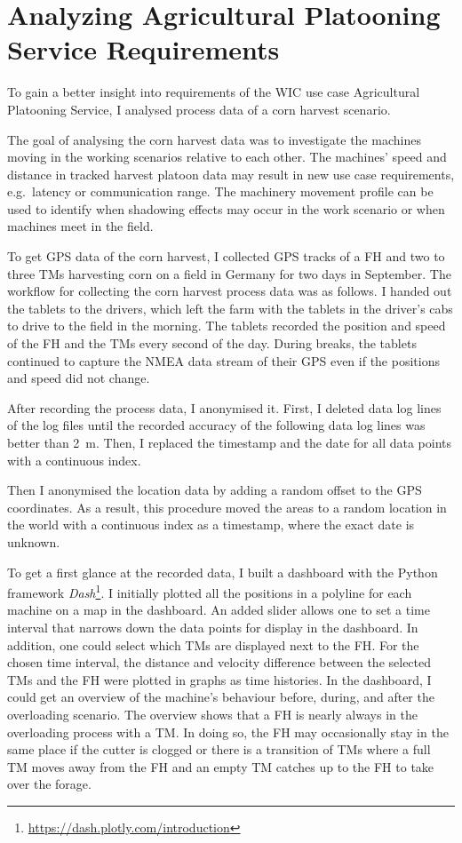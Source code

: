 \chapter{Analyzing Agricultural Platooning Service Requirements}
\label{chap:cornHarvestData}
To gain a better insight into requirements of the \ac{WIC} use case Agricultural Platooning Service,
I analysed process data of a corn harvest scenario.

The goal of analysing the corn harvest data was to investigate the machines moving in the working scenarios relative to each other.
The machines' speed and distance in tracked harvest platoon data may result in new use case requirements,
e.g.\ latency or communication range.
The machinery movement profile can be used to identify when shadowing effects may occur in the work scenario or
when machines meet in the field.

To get GPS data of the corn harvest,
I collected GPS tracks of a \ac{FH} and two to three \ac{TM}s harvesting corn on a field in Germany for two days in September.
The workflow for collecting the corn harvest process data was as follows.
I handed out the tablets to the drivers, which left the farm with the tablets in the driver's cabs to drive to
the field in the morning.
The tablets recorded the position and speed of the \ac{FH} and the \ac{TM}s every second of the day.
During breaks, the tablets continued to capture the NMEA data stream of their GPS even if the positions and speed did not change.

After recording the process data, I anonymised it.
First, I deleted data log lines of the log files until the recorded accuracy of the following data log lines was better than
\SI{2}{\metre}.
Then, I replaced the timestamp and the date for all data points with a continuous index.

Then I anonymised the location data by adding a random offset to the GPS coordinates.
As a result, this procedure moved the areas to a random location in the world with a continuous index as a timestamp,
where the exact date is unknown.

To get a first glance at the recorded data, I built a dashboard with the Python framework \textit{Dash}\footnote{\url{https://dash.plotly.com/introduction}}.
I initially plotted all the positions in a polyline for each machine
on a map in the dashboard.
An added slider allows one to set a time interval that narrows down the data points for
display in the dashboard.
In addition, one could select which \ac{TM}s are displayed next to the \ac{FH}.
For the chosen time interval, the distance and velocity difference between the selected \ac{TM}s and the \ac{FH} were
plotted in graphs as time histories.
In the dashboard, I could get an overview of the machine's behaviour
before, during, and after the overloading scenario.
The overview shows that a \ac{FH} is nearly always in the overloading process with a \ac{TM}.
In doing so, the \ac{FH} may occasionally stay in the same place if the cutter is clogged or there is a
transition of \ac{TM}s where a full \ac{TM} moves away from the \ac{FH} and an empty \ac{TM} catches up to the
\ac{FH} to take over the forage.

